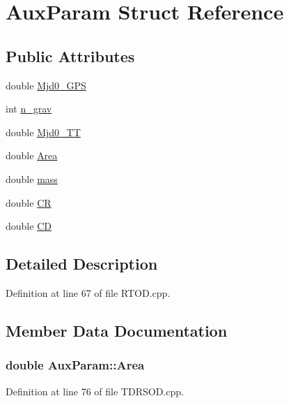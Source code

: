 \hypertarget{structAuxParam}{\section{Aux\-Param Struct Reference}
\label{structAuxParam}
}
\subsection*{Public Attributes}
\begin{DoxyCompactItemize}
\item 
double \hyperlink{structAuxParam_ac11f26de5fc55f2ae6fa20349290be18}{Mjd0\-\_\-\-G\-P\-S}
\item 
int \hyperlink{structAuxParam_a18fb836f348b92544dc701bb831ab366}{n\-\_\-grav}
\item 
double \hyperlink{structAuxParam_a57f18ab074819216ae0dcc8d4966e636}{Mjd0\-\_\-\-T\-T}
\item 
double \hyperlink{structAuxParam_abcebf1a69b5a06b594f99e39c79b4a47}{Area}
\item 
double \hyperlink{structAuxParam_afb25e5df632f3a7ba7b18755dcad08ad}{mass}
\item 
double \hyperlink{structAuxParam_ab3aad49adad1f5abe376ef54d87a5564}{C\-R}
\item 
double \hyperlink{structAuxParam_af83c855c2c9a458df9fb34c0aa20c1fc}{C\-D}
\end{DoxyCompactItemize}


\subsection{Detailed Description}


Definition at line 67 of file R\-T\-O\-D.\-cpp.



\subsection{Member Data Documentation}
\hypertarget{structAuxParam_abcebf1a69b5a06b594f99e39c79b4a47}{
\subsubsection[{Area}]{\setlength{\rightskip}{0pt plus 5cm}double Aux\-Param\-::\-Area}}\label{structAuxParam_abcebf1a69b5a06b594f99e39c79b4a47}


Definition at line 76 of file T\-D\-R\-S\-O\-D.\-cpp.

